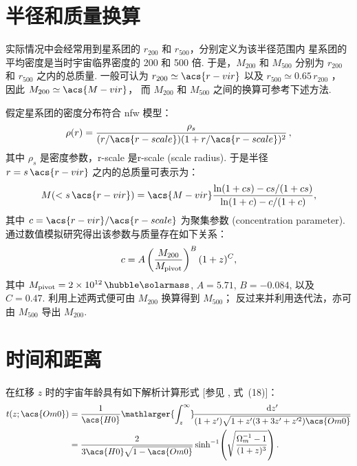 \section{半径和质量换算}

实际情况中会经常用到星系团的 $r_{200}$ 和 $r_{500}$，分别定义为该半径范围内
星系团的平均密度是当时宇宙临界密度的 200 和 500 倍.
于是，$M_{200}$ 和 $M_{500}$ 分别为 $r_{200}$ 和 $r_{500}$ 之内的总质量.
一般可认为 $r_{200} \simeq \acs{r-vir}$
以及 $r_{500} \simeq 0.65 \, r_{200}$ \cite{ettori2009}，
因此 $M_{200} \simeq \acs{M-vir}$，
而 $M_{200}$ 和 $M_{500}$ 之间的换算可参考下述方法.

假定星系团的密度分布符合 \ac{nfw} 模型\cite{navarro1997}：
\begin{equation}
  \label{eq:nfw}
  \rho(r) = \frac{\rho_s}{
    (r / \acs{r-scale}) (1 + r / \acs{r-scale})^2} \,,
\end{equation}
其中 $\rho_s$ 是密度参数，\acs{r-scale} 是\acl{r-scale} (scale radius).
于是半径 $r = s \,\acs{r-vir}$ 之内的总质量可表示为\cite{lokas2001}：
\begin{equation}
  \label{eq:mass-r}
  M(< s \,\acs{r-vir}) = \acs{M-vir}
    \frac{\ln(1 + c s) - c s / (1 + c s)}{\ln(1 + c) - c / (1 + c)} ,
\end{equation}
其中 $c = \acs{r-vir} / \acs{r-scale}$ 为聚集参数 (concentration parameter).
 通过数值模拟研究得出该参数与质量存在如下关系：
\begin{equation}
  \label{eq:mass-c}
  c = A \left( \frac{M_{200}}{M_{\mathrm{pivot}}} \right)^B (1+z)^C ,
\end{equation}
其中 $M_{\R{pivot}} = \SI{2e12}{\per\hubble\solarmass}$,
$A = 5.71$, $B = -0.084$, 以及 $C = 0.47$.
利用上述两式便可由 $M_{200}$ 换算得到 $M_{500}$；
反过来并利用迭代法，亦可由 $M_{500}$ 导出 $M_{200}$.


\section{时间和距离}

在红移 $z$ 时的宇宙年龄具有如下解析计算形式
[参见 , 式~(18)]：
\begin{align}
  \label{eq:universe-age}
  t(z; \acs{Om0})
    & = \frac{1}{\acs{H0}} \mathlarger{\int_z^{\infty}}
      \!\frac{\D{z'}}{(1+z')\sqrt{1 + z' (3+3z'+z'^2) \acs{Om0}}}
      \nonumber \\
    & = \frac{2}{3 \acs{H0} \sqrt{1-\acs{Om0}}} \sinh^{-1}
      \!\left( \sqrt{\frac{\Omega_m^{-1} - 1}{(1+z)^3}} \right).
\end{align}

